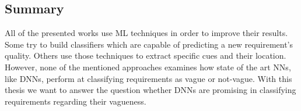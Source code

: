 \subsection{Summary}
All of the presented works use \ac{ML} techniques in order to improve their results.
Some try to build classifiers which are capable of predicting a new requirement's quality.
Others use those techniques to extract specific cues and their location.
However, none of the mentioned approaches examines how state of the art \acp{NN}, like \acp{DNN}, perform at classifying requirements as vague or not-vague.
With this thesis we want to answer the question whether \acp{DNN} are promising in classifying requirements regarding their vagueness.
